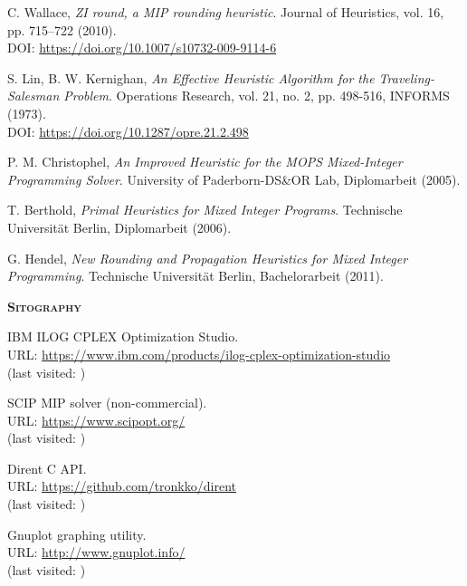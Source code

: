 \documentclass[a4paper,12pt]{book}
\begin{document}
\nocite{*}
\renewcommand{\bibname}{References}
\begin{thebibliography}{9}
	
	 C. Wallace, \textit{ZI round, a MIP rounding heuristic}. Journal of Heuristics, vol. 16, pp. 715–722 (2010). \\ DOI: \url{https://doi.org/10.1007/s10732-009-9114-6}

	 S. Lin, B. W. Kernighan, \textit{An Effective Heuristic Algorithm for the Traveling-Salesman Problem}. Operations Research, vol. 21, no. 2, pp. 498-516, INFORMS (1973). \\ DOI: \url{https://doi.org/10.1287/opre.21.2.498}

	 P. M. Christophel, \textit{An Improved Heuristic for the MOPS Mixed-Integer Programming Solver}. University of Paderborn-DS\&OR Lab, Diplomarbeit (2005).

	 T. Berthold, \textit{Primal Heuristics for Mixed Integer Programs}. Technische Universität Berlin, Diplomarbeit (2006).

	 G. Hendel, \textit{New Rounding and Propagation Heuristics for Mixed Integer Programming}. Technische Universität Berlin, Bachelorarbeit (2011).
	
	\vspace{0.5cm}
	\textsc{\Large \textbf{Sitography}}

	 IBM ILOG CPLEX Optimization Studio. \\ URL: \url{https://www.ibm.com/products/ilog-cplex-optimization-studio} \\ (last visited: )

	 SCIP MIP solver (non-commercial). \\ URL: \url{https://www.scipopt.org/} \\ (last visited: )

	 Dirent C API. \\ URL: \url{https://github.com/tronkko/dirent} \\ (last visited: )

	 Gnuplot graphing utility. \\ URL: \url{http://www.gnuplot.info/} \\ (last visited: )


\end{thebibliography}
\end{document}
